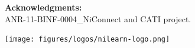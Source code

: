 \documentclass[portrait,a0,final]{a0poster} %
\begin{document}
\begin{minipage}{0.98\linewidth}
\begin{minipage}[t]{0.48\linewidth}
\nocite{*}
\begin{spacing}{0.6}


\end{spacing}

\begin{spacing}{0.7}
\begin{minipage}[c]{0.675\linewidth}
    \begin{center}
\vspace{0.1\linewidth}
\textbf{\large Acknowledgments:}\\
\vspace{0.02\linewidth}
\large{ANR-11-BINF-0004\_NiConnect and CATI project}.
\end{center}

\end{minipage}
\end{spacing}

\begin{minipage}[c]{0.995\linewidth}
\vspace{0pt}
\begin{flushright}
\vspace{-0.03\linewidth}
\texttt{[image: figures/logos/nilearn-logo.png]}
\end{flushright}
\end{minipage}

\end{minipage}
\end{minipage} %

\vfill %


\end{document}

